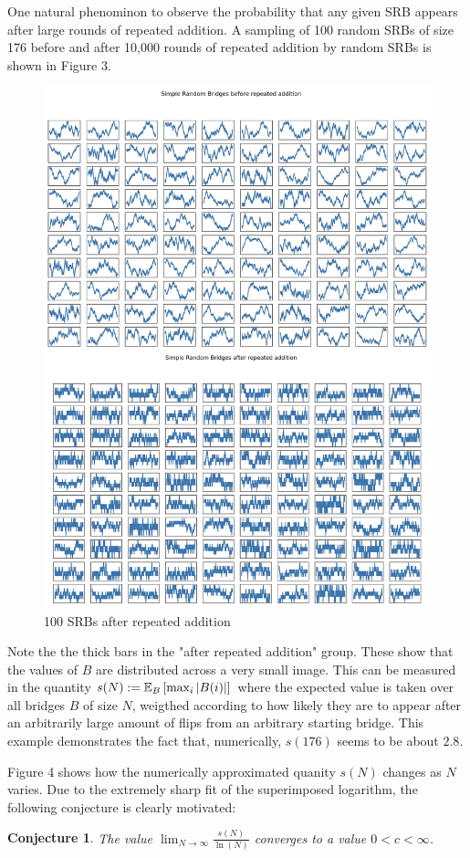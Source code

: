 \documentclass{article}
\newtheorem{conjecture}{Conjecture}
\theoremstyle{definition}
\begin{document}
One natural phenominon to observe the probability that any given SRB appears after large rounds of repeated addition. A sampling of 100 random SRBs of size 176 before and after 10,000 rounds of repeated addition by random SRBs is shown in Figure 3.

\begin{figure}[h!]
\caption{100 SRBs after repeated addition}
\centering
\includegraphics[width=.75\textwidth]{Figure_3}
\end{figure}

Note the the thick bars in the "after repeated addition" group. These show that the values of $B$ are distributed across a very small image. This can be measured in the quantity $s(N):=\mathbb{E}_{B}\left[\max_{i}|B(i)|\right]$ where the expected value is taken over all bridges $B$ of size $N$, weigthed according to how likely they are to appear after an arbitrarily large amount of flips from an arbitrary starting bridge. This example demonstrates the fact that, numerically, $s(176)$ seems to be about $2.8$.

Figure 4 shows how the numerically approximated quanity $s(N)$ changes as $N$ varies. Due to the extremely sharp fit of the superimposed logarithm, the following conjecture is clearly motivated:

\begin{conjecture} The value $\lim_{N\to\infty}\frac{s(N)}{\ln(N)}$ converges to a value $0<c<\infty$.
\end{conjecture}
\end{document}
